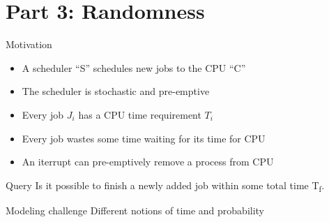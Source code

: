 \documentclass{beamer}
\begin{document}
 \section{Part 3: Randomness}
   \begin{frame}{Motivation}
     \begin{figure}
       \begin{center}



     \label{fig:ex1}
   \end{center}
 \end{figure}
 \begin{itemize}
 \item A scheduler ``S'' schedules new
   jobs to the CPU ``C''
   \item The scheduler is stochastic and pre-emptive
 \item Every job $J_i$ has a CPU time requirement $T_i$
 \item Every job wastes some time waiting for its time for CPU
 \item An iterrupt can pre-emptively remove a process from CPU
\pause
 \end{itemize}
 \begin{block}{Query}
 Is it possible to finish a newly added job within
     some total time T\textsubscript{f}.
\end{block}
\begin{block}{Modeling challenge}
Different notions of time and probability
\end{block}
 \end{frame}
\end{document}
